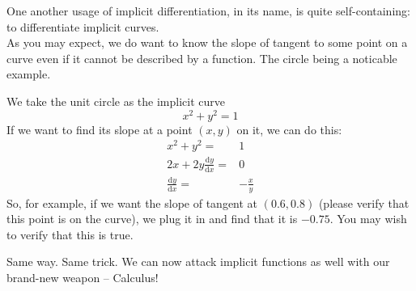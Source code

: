 One another usage of implicit differentiation, in its name, is quite self-containing: to differentiate implicit curves.\\
As you may expect, we do want to know the slope of tangent to some point on a curve even if it cannot be described by a function.
The circle being a noticable example.
\begin{example}
    We take the unit circle as the implicit curve
    $$x^2+y^2=1$$
    If we want to find its slope at a point $(x,y)$ on it, we can do this:
    \begin{align*}
        x^2+y^2=&1\\
        2x+2y\frac{\mathrm dy}{\mathrm dx}=&0\\
        \frac{\mathrm dy}{\mathrm dx}=&-\frac{x}{y}
    \end{align*}
    So, for example, if we want the slope of tangent at $(0.6,0.8)$ (please verify that this point is on the curve), we plug it in and find that it is $-0.75$.
    You may wish to verify that this is true.
\end{example}
Same way.
Same trick.
We can now attack implicit functions as well with our brand-new weapon -- Calculus!